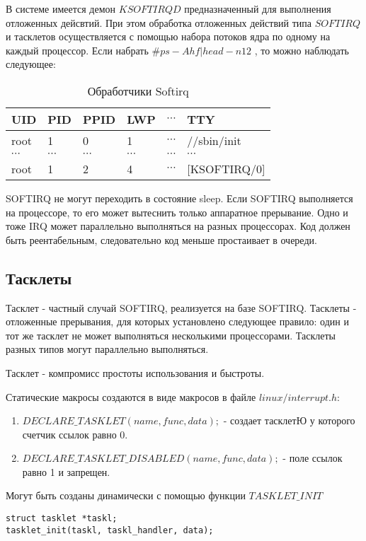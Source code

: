 В системе имеется демон $KSOFTIRQD$ предназначенный для выполнения отложенных дейсвтий. При этом обработка отложенных действий типа $SOFTIRQ$ и тасклетов осуществляется с помощью набора потоков ядра по одному на каждый процессор. Если набрать $\# ps -Ahf | head -n12$ , то можно наблюдать следующее:

\begin{table}[H]
\caption{Обработчики Softirq}
\begin{tabular}{|l|l|l|l|l|l|}
\hline
UID & PID & PPID & LWP & $\cdots$ & TTY\\
\hline
root & 1 & 0 & 1 & $\cdots$ & //sbin/init \\
$\cdots$ & $\cdots$ & $\cdots$ & $\cdots$ & $\cdots$ & $\cdots$\\
root & 1 & 2 & 4 & $\cdots$ & [KSOFTIRQ/0]\\
\hline
\end{tabular}
\end{table}

SOFTIRQ не могут переходить в состояние sleep. Если SOFTIRQ выполняется на процессоре, то его может вытеснить только аппаратное прерывание. Одно и тоже IRQ может параллельно выполняться на разных процессорах. Код должен быть реентабельным, следовательно код меньше простаивает в очереди.

\subsection{Тасклеты}
Тасклет - частный случай SOFTIRQ, реализуется на базе SOFTIRQ. Тасклеты - отложенные прерывания, для которых установлено следующее правило: один и тот же тасклет не может выполняться несколькими процессорами. Тасклеты разных типов могут параллельно выполняться.

Тасклет - компромисс простоты использования и быстроты. 

Статические макросы создаются в виде макросов в файле $linux/interrupt.h$:
\begin{enumerate}
	\item $DECLARE\_TASKLET(name, func, data);$ - создает тасклетЮ у которого счетчик ссылок равно 0.
	\item $DECLARE\_TASKLET\_DISABLED(name, func, data);$ - поле ссылок равно 1 и запрещен.
\end{enumerate}

Могут быть созданы динамически с помощью функции $TASKLET\_INIT$
\begin{lstlisting}
struct tasklet *taskl;
tasklet_init(taskl, taskl_handler, data);
\end{lstlisting}

